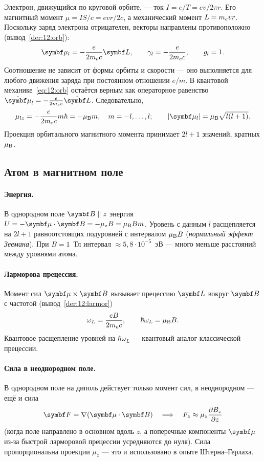 Электрон, движущийся по круговой орбите, — ток $I=e/T=ev/2\pi r$. Его магнитный момент
$\mu=IS/c=evr/2c$, а механический момент $L=m_e vr$. Поскольку заряд электрона отрицателен, векторы
направлены противоположно (вывод~\ref{der:12:orb}):
\begin{equation}\label{eq:12:orb}
  \vect\mu_l=-\frac{e}{2\mel c}\vect L,\qquad \gamma_l=-\frac{e}{2\mel c},\qquad g_l=1 .
\end{equation}
Соотношение не зависит от формы орбиты и скорости — оно выполняется для любого движения заряда при
постоянном отношении $e/m$. В квантовой механике~\eqref{eq:12:orb} остаётся верным как операторное
равенство $\op{\vect\mu}_l=-\frac{e}{2\mel c}\op{\vect L}$. Следовательно,
\begin{equation}\label{eq:12:muz}
  \mu_{lz}=-\frac{e}{2\mel c}m\hbar=-\muB m,\quad m=-l,\dots,l;\qquad
  |\vect\mu_l|=\muB\sqrt{l(l+1)} .
\end{equation}
Проекция орбитального магнитного момента принимает $2l+1$ значений, кратных $\mu_{\mathrm B}$.

\subsection{Атом в магнитном поле}

\paragraph{Энергия.} В однородном поле $\vect B\parallel z$ энергия $U=-\vect\mu\cdot\vect B=-\mu_zB=\muB Bm$. Уровень
с данным $l$ расщепляется на $2l+1$ равноотстоящих подуровней с интервалом $\mu_{\mathrm B} B$ (\emph{нормальный эффект
Зеемана}). При $B=1$~Тл интервал $\approx5{,}8\cdot10^{-5}$~эВ — много меньше расстояний между уровнями атома.

\paragraph{Ларморова прецессия.} Момент сил $\vect\mu\times\vect B$ вызывает прецессию $\vect L$ вокруг $\vect B$ с частотой
(вывод~\ref{der:12:larmor})
\begin{equation}\label{eq:12:larmor}
  \omega_L=\frac{eB}{2m_e c},\qquad \hbar\omega_L=\mu_{\mathrm B} B .
\end{equation}
Квантовое расщепление уровней на $\hbar\omega_L$ — квантовый аналог классической прецессии.

\paragraph{Сила в неоднородном поле.} В однородном поле на диполь действует только момент сил, в
неоднородном — ещё и сила
\begin{equation}\label{eq:12:force}
  \vect F=\nabla(\vect\mu\cdot\vect B)\quad\Longrightarrow\quad F_z\approx\mu_z\pdiff{B_z}{z}
\end{equation}
(когда поле направлено в основном вдоль $z$, а поперечные компоненты $\vect\mu$ из-за быстрой ларморовой
прецессии усредняются до нуля). Сила пропорциональна проекции $\mu_z$ — это и использовано в опыте
Штерна--Герлаха.

